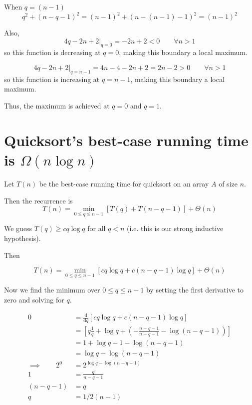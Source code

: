 \documentclass[paper=a4, fontsize=11pt]{scrartcl} %
\numberwithin{equation}{section} %
\numberwithin{figure}{section} %
\numberwithin{table}{section} %
\begin{document}
When $q = (n-1)$
\[q^2 + (n - q - 1)^2 = (n-1)^2 + (n - (n-1) - 1)^2 = (n-1)^2\]

Also,
\[4q - 2n + 2 \Bigr|_{q = 0} = -2n + 2 < 0 \qquad{} \forall n > 1\]
so this function is decreasing at $q = 0$, making this boundary a local maximum.

\[4q - 2n + 2 \Bigr|_{q = n-1} = 4n  - 4 - 2n + 2 = 2n - 2 > 0 \qquad{} \forall n > 1\]
so this function is increasing at $q = n-1$, making this boundary a local maximum.

Thus, the maximum is achieved at $q = 0$ and $q = 1$.

\section{Quicksort's best-case running time is $\Omega(n \log n)$}

Let $T(n)$ be the best-case running time for quicksort on an array $A$ of size $n$.

Then the recurrence is
\[T(n) = \min_{0 \leq q \leq n-1} \left[T(q) + T(n - q - 1)\right] + \Theta(n)\]

We guess $T(q) \geq c q \log q$ for all $q < n$ (i.e. this is our strong inductive hypothesis).

Then

\[T(n) = \min_{0 \leq q \leq n-1} \left[c q \log q + c(n - q - 1)\log q\right] + \Theta(n)\]

Now we find the minimum over $0 \leq q \leq n-1$ by setting the first derivative to zero and solving for $q$. 

\begin{align*}
0 &= \frac{\textrm{d}}{\textrm{d}q} \left[c q \log q + c(n - q - 1)\log q\right] \\
	&= \left[q \frac{1}{q} + \log q + \left(-\frac{n - q - 1}{n - q - 1} - \log(n - q  - 1)\right)\right] \\
	&= 1 + \log q - 1 - \log(n - q - 1) \\
	&= \log q - \log(n - q - 1) \\
\implies \qquad{} 2^0 &= 2^{\log q - \log(n - q - 1)} \\
1 &= \frac{q}{n - q - 1} \\
(n - q - 1) &= q \\
q &= 1/2 (n - 1)
\end{align*}
\end{document}
